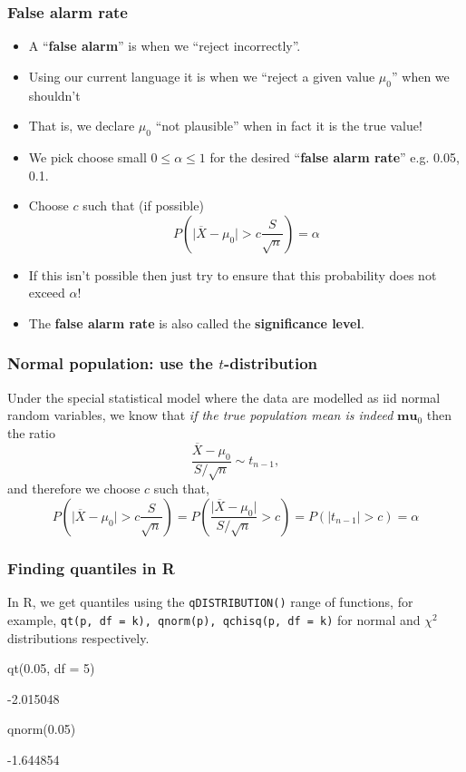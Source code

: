 \documentclass[a4paper]{article}
\begin{document}
\subsubsection{False alarm rate}
\begin{itemize}
	\item A ``\textcolor{mygreen}{\textbf{false alarm}}'' is when we ``reject incorrectly''.
	\item Using our current language it is when we ``reject a given value \( \mu_0 \)'' when we shouldn't
	\item That is, we declare \( \mu_0 \) ``not plausible'' when in fact it is the true value!
	\item We pick choose small \( 0 \leq \alpha \leq 1 \) for the desired ``\textcolor{mygreen}{\textbf{false alarm rate}}'' e.g. 0.05, 0.1.
	\item Choose \( c \) such that (if possible)
	\[
		P \left( \lvert \overline{X} - \mu_0 \rvert > c \frac{S}{\sqrt{n}} \right) = \alpha
	\]
	\item If this isn't possible then just try to ensure that this probability does not exceed \( \alpha \)!
	\item The \textcolor{mygreen}{\textbf{false alarm rate}} is also called the \textcolor{mygreen}{\textbf{significance level}}. 
\end{itemize}
\subsubsection{Normal population: use the \( t \)-distribution}
Under the special statistical model where the data are modelled as \textcolor{mygreen}{iid normal random variables}, we know that \textit{if the true population mean is indeed} \( \symbf{mu}_0 \) then the ratio
\[
	\frac{\overline{X} - \mu_0}{S / \sqrt{n}} \sim t_{n-1},
\]
and therefore we choose \( c \) such that,
\[
	P \left( \lvert \overline{X} - \mu_0 \rvert > c \frac{S}{\sqrt{n}} \right) = P \left( \frac{\lvert \overline{X} - \mu_0 \rvert}{S / \sqrt{n}} > c \right) = P(\lvert t_{n-1} \rvert > c) = \alpha
\]
\subsubsection{Finding quantiles in R}
In R, we get quantiles using the \lstinline|qDISTRIBUTION()| range of functions, for example, \lstinline|qt(p, df = k), qnorm(p), qchisq(p, df = k)| for normal and \( \chi^2 \)  distributions respectively.
\begin{Schunk}
\begin{Sinput}
qt(0.05, df = 5)
\end{Sinput}
\begin{Soutput}
[1] -2.015048
\end{Soutput}
\begin{Sinput}
qnorm(0.05)
\end{Sinput}
\begin{Soutput}
[1] -1.644854
\end{Soutput}
\end{Schunk}
\end{document}

